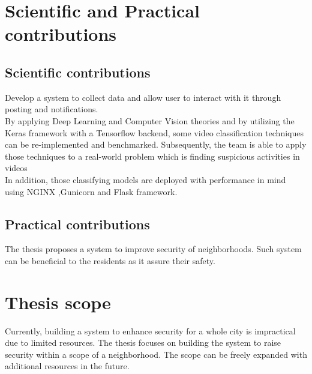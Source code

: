 \section{Scientific and Practical contributions}
\subsection{Scientific contributions}
Develop a system to collect data and allow user to interact with it through posting and notifications. \\
By applying Deep Learning and Computer Vision theories and by utilizing the Keras framework with a Tensorflow backend, some video classification techniques can be re-implemented and benchmarked. Subsequently, the team is able to apply those techniques to a real-world problem which is finding suspicious activities in videos \\ %
In addition, those classifying models are deployed with performance in mind using NGINX ,Gunicorn and Flask framework.
\subsection{Practical contributions}
The thesis proposes a system to improve security of neighborhoods. Such system can be beneficial to the residents as it assure their safety.
\section{Thesis scope}
Currently, building a system to enhance security for a whole city is impractical due to limited resources. The thesis focuses on building the system to raise security within a scope of a neighborhood. The scope can be freely expanded with additional resources in the future.
